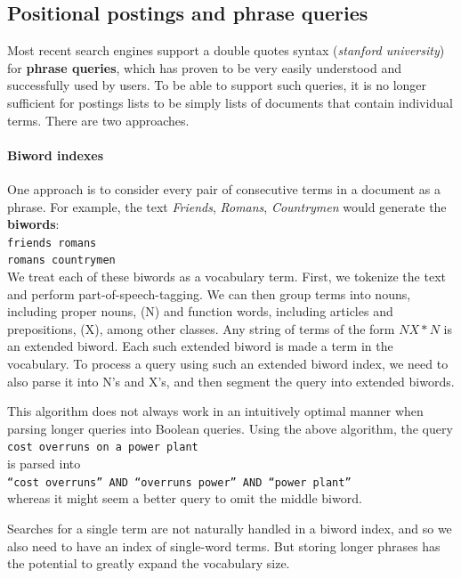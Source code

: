 \documentclass[letterpaper,11pt]{article}
\newcommand{\code}[1]{\texttt{#1}}
\begin{document}
\subsection{Positional postings and phrase queries}
Most recent search engines support a double quotes syntax (\textit{stanford university}) for \textbf{phrase queries}, which has proven to be very easily understood and successfully used by users. To be able to support such queries, it is no longer sufficient for postings lists to be simply lists of documents that contain individual terms. There are two approaches.

\paragraph{Biword indexes}
One approach is to consider every pair of consecutive terms in a document as a phrase. For example, the text \textit{Friends}, \textit{Romans}, \textit{Countrymen} would generate the \textbf{biwords}:
\medskip\\
\indent \code{friends romans}\\
\indent \code{romans countrymen}
\medskip\\
We treat each of these biwords as a vocabulary term. First, we tokenize the text and perform part-of-speech-tagging. We can then group terms into nouns, including proper nouns, (N) and function words, including articles and prepositions, (X), among other classes. Any string of terms of the form $NX*N$ is an extended biword. Each such extended biword is made a term in the vocabulary. To process a query using such an extended biword index, we need to also parse it into N’s and X’s, and then segment the query into extended biwords.

This algorithm does not always work in an intuitively optimal manner when parsing longer queries into Boolean queries. Using the above algorithm, the query
\medskip\\
\indent \code{cost overruns on a power plant}
\medskip\\
is parsed into
\medskip\\
\indent \code{“cost overruns” AND “overruns power” AND “power plant”}
\medskip\\
whereas it might seem a better query to omit the middle biword.

Searches for a single term are not naturally handled in a biword index, and so we also need to have an index of single-word terms. But storing longer phrases has the potential to greatly expand the vocabulary size.
\end{document}
